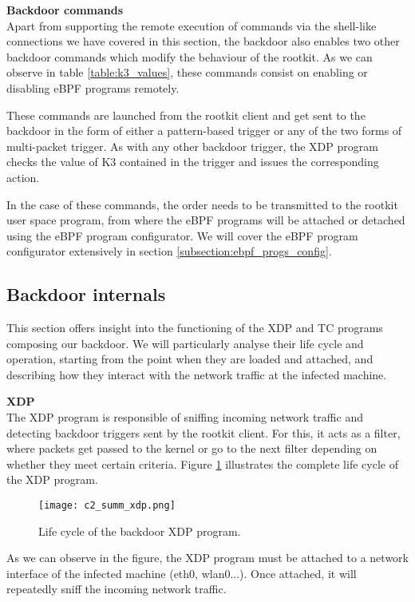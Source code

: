 \textbf{Backdoor commands}\\
Apart from supporting the remote execution of commands via the shell-like connections we have covered in this section, the backdoor also enables two other backdoor commands which modify the behaviour of the rootkit. As we can observe in table \ref{table:k3_values}, these commands consist on enabling or disabling eBPF programs remotely.

These commands are launched from the rootkit client and get sent to the backdoor in the form of either a pattern-based trigger or any of the two forms of multi-packet trigger. As with any other backdoor trigger, the XDP program checks the value of K3 contained in the trigger and issues the corresponding action.

In the case of these commands, the order needs to be transmitted to the rootkit user space program, from where the eBPF programs will be attached or detached using the eBPF program configurator. We will cover the eBPF program configurator extensively in section \ref{subsection:ebpf_progs_config}.


\subsection{Backdoor internals}
This section offers insight into the functioning of the XDP and TC programs composing our backdoor. We will particularly analyse their life cycle and operation, starting from the point when they are loaded and attached, and describing how they interact with the network traffic at the infected machine.

\textbf{XDP}\\
The XDP program is responsible of sniffing incoming network traffic and detecting backdoor triggers sent by the rootkit client. For this, it acts as a filter, where packets get passed to the kernel or go to the next filter depending on whether they meet certain criteria. Figure \ref{fig:c2_summ_xdp} illustrates the complete life cycle of the XDP program.

\begin{figure}[htbp]
	\centering
	\texttt{[image: c2\_summ\_xdp.png]}
	\caption{Life cycle of the backdoor XDP program.}
	\label{fig:c2_summ_xdp}
\end{figure}

As we can observe in the figure, the XDP program must be attached to a network interface of the infected machine (eth0, wlan0...). Once attached, it will repeatedly sniff the incoming network traffic.

